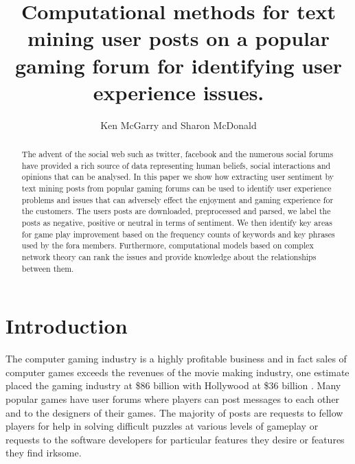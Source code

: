 \documentclass{svproc}
\begin{document}
\mainmatter              %
\title{Computational methods for text mining user posts on a popular gaming forum for identifying user experience issues.}

\author{Ken McGarry and Sharon McDonald }


\maketitle              %

\begin{abstract}
The advent of the social web such as twitter, facebook and the numerous social forums have provided a rich source of data representing human beliefs, social interactions and opinions that can be analysed. In this paper we show how extracting user sentiment by text mining posts from popular gaming forums can be used to identify user experience problems and issues that can adversely effect the enjoyment and gaming experience for the customers. The users posts are downloaded, preprocessed and parsed, we label the posts as negative, positive or neutral in terms of sentiment. We then identify key areas for game play improvement based on the frequency counts of keywords and key phrases used by the fora members. Furthermore, computational models based on complex network theory can rank the issues and provide knowledge about the relationships between them.
\end{abstract}


\section{Introduction}
The computer gaming industry is a highly profitable business and in fact sales of computer games exceeds the revenues of the movie making industry, one estimate placed the gaming industry at \$86 billion with Hollywood at \$36 billion \cite{UKIE2016}.  Many popular games have user forums where players can post messages to each other and to the designers of their games. The majority of posts are requests to fellow players for help in solving difficult puzzles at various levels of gameplay or requests to the software developers for particular features they desire or features they find irksome. 
\end{document}
